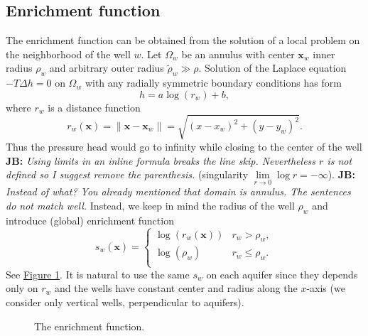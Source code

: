 \documentclass{elsarticle}
\newcommand{\fig}[1]{\hyperref[#1]{Figure \ref{#1}}}
\newcommand{\figpath}{../graphics/}
\def\vc#1{\mathbf{\boldsymbol{#1}}}     %
\newcommand{\bx}{\vc{x}}
\newcommand{\noteJB}[1]{{\color{Blue} \textbf{JB: } \textit{#1}}}
\newcommand{\notePE}[1]{{\color{Orange} \textbf{PE: } \textit{#1}}}
\begin{document}
\subsection{Enrichment function}
The enrichment function can be obtained from the solution of a local problem on the neighborhood of the well $w$.
Let $\Omega_w$ be an annulus with center $\vc x_w$ inner radius $\rho_w$ and arbitrary outer radius $\tilde \rho_w \gg \rho$.
Solution of the Laplace equation $-T \Delta h = 0$ on $\Omega_w$ with any radially symmetric boundary conditions has form
%
\begin{equation} \label{eqn:solution_form}
  h = a \log(r_w)+b, %
\end{equation}
where $r_w$ is a distance function
\begin{equation} \label{eqn:distance}
r_w(\vc{x}) = \|\bx - \vc{x}_w\|= \sqrt{(x-x_w)^2+(y-y_w)^2}.
\end{equation}
%
Thus the pressure head would go to infinity while closing to the center of the well \noteJB{Using limits in an inline formula breaks the line skip. 
Nevertheless $r$ is not defined so I suggest remove the parenthesis.}
(singularity $\lim \limits_{r\rightarrow 0} \log r= -\infty$).
\noteJB{Instead of what? You already mentioned that domain is annulus. The sentences do not match well.} 
Instead, we keep in mind the radius of the well $\rho_w$ and introduce (global) enrichment function
%
\begin{equation}
\label{eqn:enrich_func}
s_w(\bx) = 
  \begin{cases}
  \log(r_w(\bx)) & r_w > \rho_w,\\
  \log(\rho_w) & r_w \le \rho_w.\\
  \end{cases}
\end{equation}
See \fig{fig:enrich_func}.
It is natural to use the same $s_w$ on each aquifer since they depends only on $r_w$ and the wells have constant center and radius along the $x$-axis
(we consider only vertical wells, perpendicular to aquifers).
%

\begin{figure}[!htb]
  \begin{center}         
    \def\svgwidth{0.5\textwidth}
    
  \end{center}
  \caption{The enrichment function.}
  \label{fig:enrich_func}
\end{figure}
\end{document}
